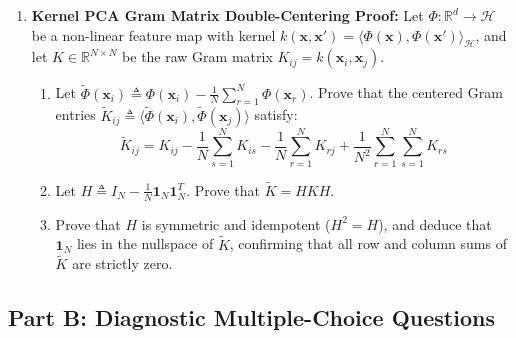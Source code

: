 \begin{enumerate}[label=\textbf{P\arabic*.}]
    \item \textbf{Kernel PCA Gram Matrix Double-Centering Proof:}
    Let $\Phi: \mathbb{R}^d \to \mathcal{H}$ be a non-linear feature map with kernel $k(\mathbf{x}, \mathbf{x}') = \langle \Phi(\mathbf{x}), \Phi(\mathbf{x}') \rangle_{\mathcal{H}}$, and let $K \in \mathbb{R}^{N \times N}$ be the raw Gram matrix $K_{ij} = k(\mathbf{x}_i, \mathbf{x}_j)$.
    \begin{enumerate}[label=(\alph*)]
        \item Let $\tilde{\Phi}(\mathbf{x}_i) \triangleq \Phi(\mathbf{x}_i) - \frac{1}{N}\sum_{r=1}^N \Phi(\mathbf{x}_r)$. Prove that the centered Gram entries $\tilde{K}_{ij} \triangleq \langle \tilde{\Phi}(\mathbf{x}_i), \tilde{\Phi}(\mathbf{x}_j) \rangle$ satisfy:
        \begin{equation}
        \tilde{K}_{ij} = K_{ij} - \frac{1}{N}\sum_{s=1}^N K_{is} - \frac{1}{N}\sum_{r=1}^N K_{rj} + \frac{1}{N^2}\sum_{r=1}^N \sum_{s=1}^N K_{rs}
        \end{equation}
        \item Let $H \triangleq I_N - \frac{1}{N}\mathbf{1}_N \mathbf{1}_N^T$. Prove that $\tilde{K} = H K H$.
        \item Prove that $H$ is symmetric and idempotent ($H^2 = H$), and deduce that $\mathbf{1}_N$ lies in the nullspace of $\tilde{K}$, confirming that all row and column sums of $\tilde{K}$ are strictly zero.
    \end{enumerate}
\end{enumerate}

\subsection*{Part B: Diagnostic Multiple-Choice Questions}

